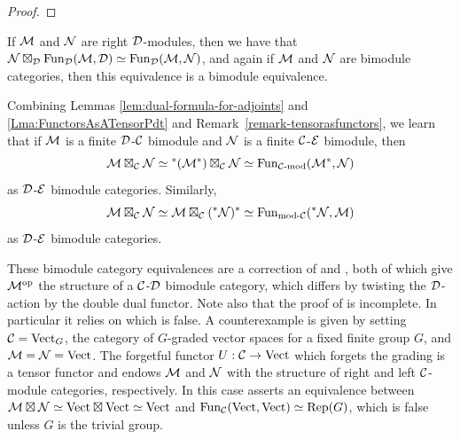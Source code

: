 \documentclass{amsart}
\begin{document}
\begin{proof}
\end{proof}

\begin{remark} \label{remark-tensorasfunctors}
If $\mathcal M$ and $\mathcal N$ are right $\mathcal D$-modules, then we have that $\mathcal N \boxtimes_\mathcal D \operatorname{Fun}_{\mathcal D}(\mathcal M,\mathcal D) \simeq \operatorname{Fun}_{\mathcal D}(\mathcal M,\mathcal N)$, and again if $\mathcal M$ and $\mathcal N$ are bimodule categories, then this equivalence is a bimodule equivalence. 
\end{remark}



\begin{remark} \label{rmk:Deligne_pdt_as_mod_functor}
Combining Lemmas \ref{lem:dual-formula-for-adjoints} and \ref{Lma:FunctorsAsATensorPdt} and Remark~\ref{remark-tensorasfunctors}, we learn that if $\mathcal M$ is a finite $\mathcal D$-$\mathcal C$ bimodule and $\mathcal N$ is a finite $\mathcal C$-$\mathcal E$ bimodule, then 
\begin{equation*}
	\mathcal M \boxtimes_\mathcal C \mathcal N \simeq {}^*(\mathcal M^*) \boxtimes_\mathcal C \mathcal N \simeq \operatorname{Fun}_{\mathcal C\text{-mod}}(\mathcal M^*,\mathcal N)
\end{equation*}
as $\mathcal D$-$\mathcal E$ bimodule categories.   Similarly, 
\begin{equation*}
	\mathcal M \boxtimes_{\mathcal C} \mathcal N \simeq \mathcal M \boxtimes_\mathcal C ({}^*\mathcal N)^* \simeq \operatorname{Fun}_{\text{mod-}\mathcal C}({}^*\mathcal N,\mathcal M)
\end{equation*}
as $\mathcal D$-$\mathcal E$ bimodule categories. 

	 These bimodule category equivalences are a correction of \cite[Remark 3.6]{0909.3140} and \cite[Thm. 3.20]{0911.4979}, both of which give $\mathcal M^{\mathrm{op}}$ the structure of a $\mathcal C$-$\mathcal D$ bimodule category, which differs by twisting the $\mathcal D$-action by the double dual functor. Note also that the proof of \cite[Thm. 3.20]{0911.4979} is incomplete. In particular it relies on \cite[Lma. 3.21]{0911.4979} which is false. A counterexample is given by setting $\mathcal C = \mathrm{Vect}_G$, the category of $G$-graded vector spaces for a fixed finite group $G$, and $\mathcal M = \mathcal N = \mathrm{Vect}$. The forgetful functor $U:\mathcal C \to \mathrm{Vect}$ which forgets the grading is a tensor functor and endows $\mathcal M$ and $\mathcal N$ with the structure of right and left $\mathcal C$-module categories, respectively. In this case \cite[Lma. 3.21]{0911.4979} asserts an equivalence between $\mathcal M \boxtimes \mathcal N \simeq \mathrm{Vect} \boxtimes \mathrm{Vect} \simeq \mathrm{Vect}$ and $\operatorname{Fun}_\mathcal C(\mathrm{Vect}, \mathrm{Vect}) \simeq \mathrm{Rep}(G)$, which is false unless $G$ is the trivial group.
\end{remark}
\end{document}
